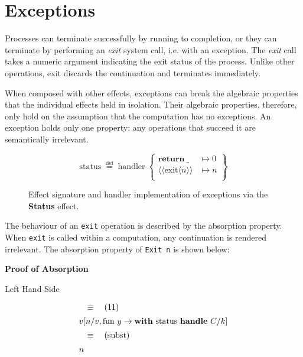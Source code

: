 \documentclass[logo,bsc,singlespacing,parskip]{infthesis}
\begin{document}
\vspace{-1em}
\section{Exceptions}
Processes can terminate successfully by running to completion, or they can terminate by performing an \textit{exit} system call, i.e. with an exception. The \textit{exit} call takes a numeric argument indicating the exit status of the process. Unlike other operations, exit discards the continuation and terminates immediately.

When composed with other effects, exceptions can break the algebraic properties that the individual effects held in isolation. Their algebraic properties, therefore, only hold on the assumption that the computation has no exceptions. An exception holds only one property; any operations that succeed it are semantically irrelevant.

\begin{figure}[H]
\centering


\vspace{-1em}

\[
\mathrm{status} \;\overset{\mathrm{def}}{=}\;
\mathrm{handler} \;\left\{
\begin{array}{ll}
  \mathrm{\textbf{return}\:\_} & \mapsto 0 \\[0.5ex]
  \langle\!\langle \mathrm{exit} \langle n\rangle\rangle & \mapsto n \\[0.5ex]
\end{array}
\right\}
\]

\caption{Effect signature and handler implementation of exceptions via the \textbf{Status} effect.}
\label{fig:status-handler}
\end{figure}


The behaviour of an \lstinline{exit} operation is described by the absorption property. When \lstinline{exit} is called within a computation, any continuation is rendered irrelevant. The absorption property of \lstinline{Exit n} is shown below:



{\large \textbf{Proof of Absorption}}

{Left Hand Side}

\[
\begin{array}{l}
\quad\equiv\quad (11) \\[5pt]
v [n/v, \text{fun } y \rightarrow \text{\textbf{with} status \textbf{handle} } C/k] \\[5pt]
\quad\equiv\quad (\text{subst}) \\[5pt]
n
\end{array}
\]
\end{document}
